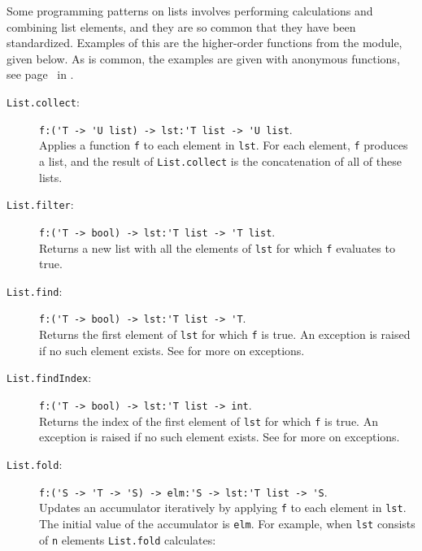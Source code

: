 \documentclass[fsharpNotes.tex]{subfiles}
\begin{document}
Some programming patterns on lists involves performing calculations and combining list elements, and they are so common that they have been standardized. Examples of this are the higher-order functions from the module, given below. As is common, the examples are given with anonymous functions, see page~\pageref{page:anonymousFunction} in .
\begin{description}
\item[\texttt{List.collect}:] \lstinline{f:('T -> 'U list) -> lst:'T list -> 'U list}.~\\
  Applies a function \lstinline{f} to each element in \lstinline{lst}. For each element, \lstinline{f} produces a list, and the result of \lstinline{List.collect} is the concatenation of all of these lists.
\item[\texttt{List.filter}:] \lstinline{f:('T -> bool) -> lst:'T list -> 'T list}.~\\
  Returns a new list with all the elements of \lstinline{lst} for which \lstinline{f} evaluates to true.
\item[\texttt{List.find}:] \lstinline{f:('T -> bool) -> lst:'T list -> 'T}.~\\
  Returns the first element of \lstinline{lst} for which \lstinline{f} is true. An exception is raised if no such element exists. See  for more on exceptions.
\item[\texttt{List.findIndex}:] \lstinline{f:('T -> bool) -> lst:'T list -> int}.~\\
  Returns the index of the first element of \lstinline{lst} for which \lstinline{f} is true. An exception is raised if no such element exists. See  for more on exceptions.
\item[\texttt{List.fold}:] \lstinline{f:('S -> 'T -> 'S) -> elm:'S -> lst:'T list -> 'S}.~\\
  Updates an accumulator iteratively by applying \lstinline{f} to each element in \lstinline{lst}. The initial value of the accumulator is \lstinline{elm}. For example, when \lstinline{lst} consists of \lstinline{n} elements
  \lstinline{List.fold} calculates:
  \begin{quote}

\end{quote}
\end{description}
\end{document}
